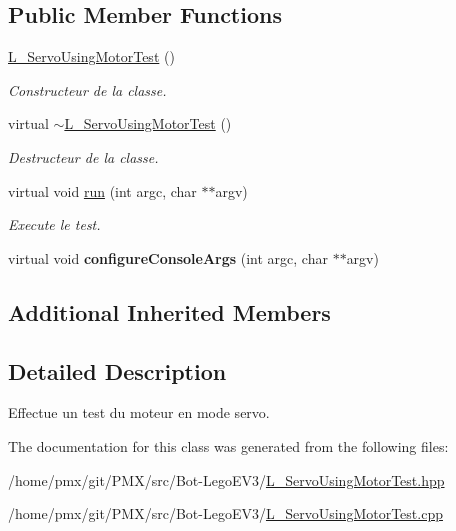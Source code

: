 \subsection*{Public Member Functions}
\begin{DoxyCompactItemize}
\item 
\mbox{\label{classL__ServoUsingMotorTest_a1b6fc1f89e70ee765dd6e11b3ffc9761}} 
\hyperlink{classL__ServoUsingMotorTest_a1b6fc1f89e70ee765dd6e11b3ffc9761}{L\+\_\+\+Servo\+Using\+Motor\+Test} ()
\begin{DoxyCompactList}\small\item\em Constructeur de la classe. \end{DoxyCompactList}\item 
\mbox{\label{classL__ServoUsingMotorTest_aa8af5e0a854dde2a83d9d94c59f81212}} 
virtual \hyperlink{classL__ServoUsingMotorTest_aa8af5e0a854dde2a83d9d94c59f81212}{$\sim$\+L\+\_\+\+Servo\+Using\+Motor\+Test} ()
\begin{DoxyCompactList}\small\item\em Destructeur de la classe. \end{DoxyCompactList}\item 
\mbox{\label{classL__ServoUsingMotorTest_a5da92b0b22c5e55b230547a2be00c940}} 
virtual void \hyperlink{classL__ServoUsingMotorTest_a5da92b0b22c5e55b230547a2be00c940}{run} (int argc, char $\ast$$\ast$argv)
\begin{DoxyCompactList}\small\item\em Execute le test. \end{DoxyCompactList}\item 
\mbox{\label{classL__ServoUsingMotorTest_a06d54baa9be380bc9601df28dc3d209e}} 
virtual void {\bfseries configure\+Console\+Args} (int argc, char $\ast$$\ast$argv)
\end{DoxyCompactItemize}
\subsection*{Additional Inherited Members}


\subsection{Detailed Description}
Effectue un test du moteur en mode servo. 

The documentation for this class was generated from the following files\+:\begin{DoxyCompactItemize}
\item 
/home/pmx/git/\+P\+M\+X/src/\+Bot-\/\+Lego\+E\+V3/\hyperlink{L__ServoUsingMotorTest_8hpp}{L\+\_\+\+Servo\+Using\+Motor\+Test.\+hpp}\item 
/home/pmx/git/\+P\+M\+X/src/\+Bot-\/\+Lego\+E\+V3/\hyperlink{L__ServoUsingMotorTest_8cpp}{L\+\_\+\+Servo\+Using\+Motor\+Test.\+cpp}\end{DoxyCompactItemize}
